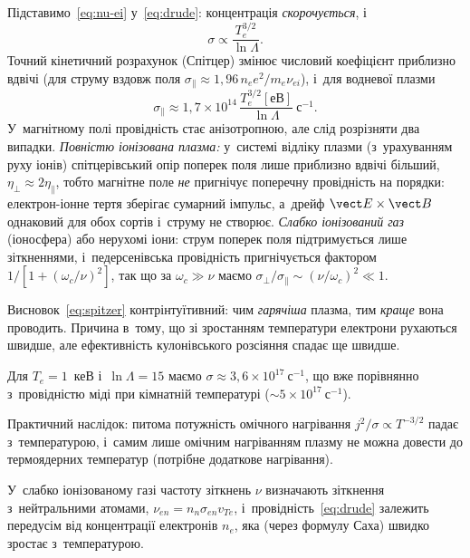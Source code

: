 Підставимо~\eqref{eq:nu-ei} у~\eqref{eq:drude}: концентрація \emph{скорочується}, і
\begin{equation}\label{eq:spitzer}
	\sigma\propto\frac{T_e^{3/2}}{\ln\Lambda}.
\end{equation}
Точний кінетичний розрахунок (Спітцер) змінює числовий коефіцієнт приблизно вдвічі (для
струму вздовж поля $\sigma_\parallel\approx1{,}96\,n_ee^2/m_e\nu_{ei}$), і~для водневої
плазми
\begin{equation*}
	\sigma_\parallel\approx1{,}7\times10^{14}\,\frac{T_e^{3/2}[\text{еВ}]}{\ln\Lambda}~\mathrm{с}^{-1}.
\end{equation*}
У~магнітному полі провідність стає анізотропною, але слід розрізняти два випадки.
\emph{Повністю іонізована плазма:} у~системі відліку плазми (з~урахуванням руху іонів) спітцерівський
опір поперек поля лише приблизно вдвічі більший, $\eta_\perp\approx2\eta_\parallel$, тобто магнітне
поле \emph{не} пригнічує поперечну провідність на порядки: електрон-іонне тертя зберігає сумарний
імпульс, а~дрейф $\vect E\times\vect B$ однаковий для обох сортів і~струму не створює.
\emph{Слабко іонізований газ} (іоносфера) або нерухомі іони: струм поперек поля підтримується лише
зіткненнями, і~педерсенівська провідність пригнічується фактором
$1/[1+(\omega_c/\nu)^2]$, так що за $\omega_c\gg\nu$ маємо
$\sigma_\perp/\sigma_\parallel\sim(\nu/\omega_c)^2\ll1$.

Висновок~\eqref{eq:spitzer} контрінтуїтивний: чим \emph{гарячіша} плазма, тим \emph{краще}
вона проводить. Причина в~тому, що зі зростанням температури електрони рухаються швидше,
але ефективність кулонівського розсіяння спадає ще швидше.

\begin{Estimate}
Для $T_e=1$~кеВ і~$\ln\Lambda=15$ маємо $\sigma\approx3{,}6\times10^{17}~\mathrm{с}^{-1}$, що вже
порівнянно з~провідністю міді при кімнатній температурі ($\sim5\times10^{17}~\mathrm{с}^{-1}$).
\end{Estimate}

Практичний наслідок: питома потужність омічного
нагрівання $j^2/\sigma\propto T^{-3/2}$ падає з~температурою, і~самим лише омічним
нагріванням плазму не можна довести до термоядерних температур (потрібне додаткове
нагрівання).

У~слабко іонізованому газі частоту зіткнень $\nu$ визначають зіткнення з~нейтральними атомами,
$\nu_{en}=n_n\sigma_{en}v_{Te}$, і~провідність~\eqref{eq:drude} залежить передусім від
концентрації електронів $n_e$, яка (через формулу Саха) швидко зростає з~температурою.

